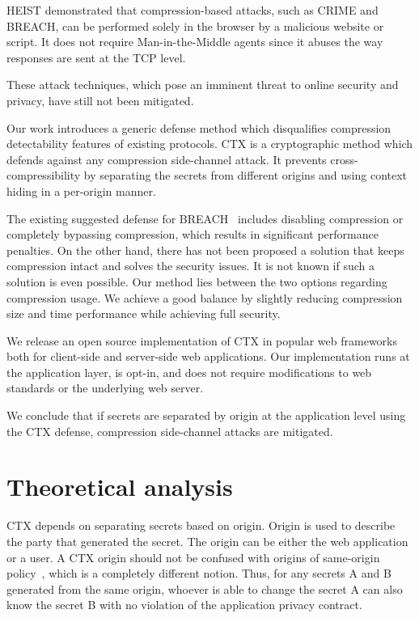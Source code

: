 \documentclass[a4paper, 11 pt, conference]{article}  %
\begin{document}
HEIST demonstrated that compression-based attacks, such as CRIME and BREACH, can
be performed solely in the browser by a malicious website or script. It does not
require Man-in-the-Middle agents since it abuses the way responses are sent at the TCP level.

These attack techniques, which pose an imminent threat to online security and privacy, have still not been mitigated.

Our work introduces a generic defense method which disqualifies compression
detectability features of existing protocols. CTX is a cryptographic method
which defends against any compression side-channel attack. It prevents
cross-compressibility by separating the secrets from different origins and using
context hiding in a per-origin manner.

The existing suggested defense for BREACH~\cite{c10} includes disabling
compression or completely bypassing compression, which results in significant
performance penalties. On the other hand, there has not been proposed a solution
that keeps compression intact and solves the security issues. It is not known if
such a solution is even possible. Our method lies between the two options
regarding compression usage. We achieve a good balance by slightly reducing
compression size and time performance while achieving full security.

We release an open source implementation of CTX in popular web frameworks both
for client-side and server-side web applications. Our implementation runs at the
application layer, is opt-in, and does not require modifications to web
standards or the underlying web server.

We conclude that if secrets are separated by origin at the application level using the CTX defense, compression side-channel attacks are mitigated.

\section{Theoretical analysis}

CTX depends on separating secrets based on origin. Origin is used to describe
the party that generated the secret. The origin can be either the web
application or a user. A CTX origin should not be confused with origins of
same-origin policy~\cite{c11}, which is a completely different notion. Thus, for any secrets A and B generated from the same origin, whoever is able to change the secret A can also know the secret B with no violation of the application privacy contract.
\end{document}
